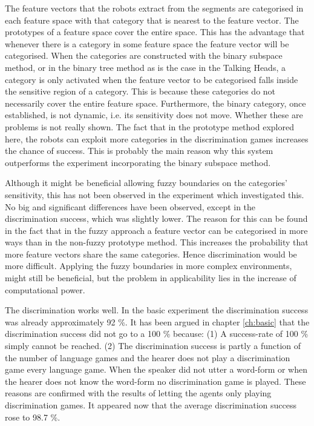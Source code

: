 The feature vectors that the robots extract from the segments are categorised in each feature space with that category that is nearest to the feature vector. The prototypes of a feature space cover the entire space. This has the advantage that whenever there is a category in some feature space the feature vector will be categorised. When the categories are constructed with the binary subspace method, or in the binary tree method \citep{steels:1996b} as is the case in the Talking Heads, a category is only activated when the feature vector to be categorised falls inside the sensitive region of a category. This is because these categories do not necessarily cover the entire feature space. Furthermore, the binary category, once established, is not dynamic, i.e. its sensitivity does not move. Whether these are problems is not really shown. The fact that in the prototype method explored here, the robots can exploit more categories in the discrimination games increases the chance of success. This is probably the main reason why this system outperforms the experiment incorporating the binary subspace method.

Although it might be beneficial allowing fuzzy boundaries on the categories' sensitivity, this has not been observed in the experiment which investigated this. No big and significant differences have been observed, except in the discrimination success, which was slightly lower. The reason for this can be found in the fact that in the fuzzy approach a feature vector can be categorised in more ways than in the non-fuzzy prototype method. This increases the probability that more feature vectors share the same categories. Hence discrimination would be more difficult. Applying the fuzzy boundaries in more complex environments, might still be beneficial, but the problem in applicability lies in the increase of computational power.


The discrimination works well. In the basic experiment the discrimination success was already approximately 92 \%. It has been argued in chapter \ref{ch:basic} that the discrimination success did not go to a 100 \% because: (1) A success-rate of 100 \% simply cannot be reached. (2) The discrimination success is partly a function of the number of language games and the hearer does not play a discrimination game every language game. When the speaker did not utter a word-form or when the hearer does not know the word-form no discrimination game is played. These reasons are confirmed with the results of letting the agents only playing discrimination games. It appeared now that the average discrimination success rose to 98.7 \%.

